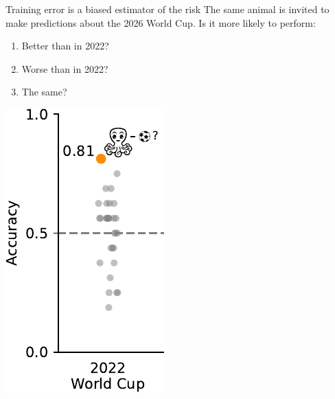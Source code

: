 \documentclass[presentation,mathserif,table]{beamer}
\begin{document}
\begin{frame}[label={sec:org8301e08}]{Training error is a biased estimator of the risk}
The same animal is invited to make predictions about the 2026 World Cup.
Is it more likely to perform:
\begin{enumerate}
\item Better than in 2022?
\item Worse than in 2022?
\item The same?
\end{enumerate}
\begin{center}
\includegraphics[height=.65 \textheight]{figures/generated/select_evaluate/select_evaluate_2b.pdf}
\end{center}
\end{frame}
\end{document}
